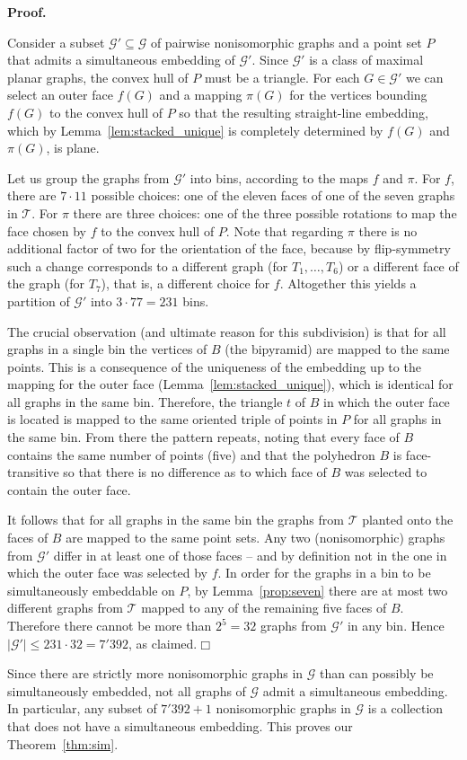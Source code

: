 \documentclass[11pt]{article}
\newcommand{\qed}{\hfill\ensuremath{\Box}}
\newenvironment{proof}{\noindent\textbf{Proof.}
}{\par\medskip}
\begin{document}
\begin{proof}
  Consider a subset $\mathcal{G}'\subseteq \mathcal{G}$ of pairwise
  nonisomorphic graphs and a point set $P$ that admits a simultaneous embedding
  of $\mathcal{G}'$. Since $\mathcal{G}'$ is a class of maximal planar graphs,
  the convex hull of $P$ must be a triangle. For each $G\in\mathcal{G}'$ we can
  select an outer face $f(G)$ and a mapping $\pi(G)$ for the vertices bounding
  $f(G)$ to the convex hull of $P$ so that the resulting straight-line
  embedding, which by Lemma~\ref{lem:stacked_unique} is completely determined by
  $f(G)$ and $\pi(G)$, is plane.

  Let us group the graphs from $\mathcal{G}'$ into bins, according to the maps
  $f$ and $\pi$. For $f$, there are $7\cdot 11$ possible choices: one of the
  eleven faces of one of the seven graphs in $\mathcal{T}$. For $\pi$ there are
  three choices: one of the three possible rotations to map the face chosen by
  $f$ to the convex hull of $P$. Note that regarding $\pi$ there is no
  additional factor of two for the orientation of the face, because by
  flip-symmetry such a change corresponds to a different graph (for
  $T_1,\ldots,T_6$) or a different face of the graph (for $T_7$), that is, a
  different choice for $f$. Altogether this yields a partition of $\mathcal{G}'$
  into $3\cdot 77=231$ bins.

  The crucial observation (and ultimate reason for this subdivision) is that for
  all graphs in a single bin the vertices of $B$ (the bipyramid) are mapped to
  the same points. This is a consequence of the uniqueness of the embedding up
  to the mapping for the outer face (Lemma~\ref{lem:stacked_unique}), which is
  identical for all graphs in the same bin. Therefore, the triangle $t$ of $B$
  in which the outer face is located is mapped to the same oriented triple of
  points in $P$ for all graphs in the same bin. From there the pattern repeats,
  noting that every face of $B$ contains the same number of points (five) and
  that the polyhedron $B$ is face-transitive so that there is no difference as
  to which face of $B$ was selected to contain the outer face.

  It follows that for all graphs in the same bin the graphs from $\mathcal{T}$
  planted onto the faces of $B$ are mapped to the same point sets. Any two
  (nonisomorphic) graphs from $\mathcal{G}'$ differ in at least one of those
  faces -- and by definition not in the one in which the outer face was selected
  by $f$. In order for the graphs in a bin to be simultaneously embeddable on
  $P$, by Lemma~\ref{prop:seven} there are at most two different graphs from
  $\mathcal{T}$ mapped to any of the remaining five faces of $B$. Therefore
  there cannot be more than $2^5=32$ graphs from $\mathcal{G}'$ in any bin.
  Hence $|\mathcal{G}'|\leq 231\cdot 32 = 7'392$, as claimed.\qed
\end{proof}
Since there are strictly more nonisomorphic graphs in $\mathcal{G}$ than can
possibly be simultaneously embedded, not all graphs of $\mathcal{G}$ admit a
simultaneous embedding.  In particular, any subset of $7'392 + 1$ nonisomorphic
graphs in $\mathcal{G}$ is a collection that does not have a simultaneous
embedding. This proves our Theorem~\ref{thm:sim}.
\end{document}
